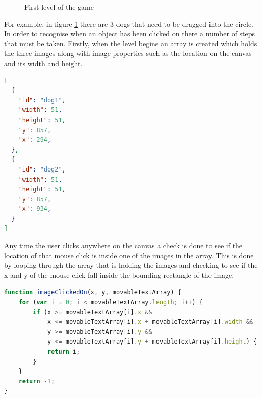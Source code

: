 \documentclass[12pt,a4paper]{report}
\begin{document}
\begin{figure}[h]
  \centering
  \begin{minipage}[b]{1\textwidth}
    \caption{First level of the game}
    \label{fig:selectDogs}
  \end{minipage}
\end{figure}
\FloatBarrier

For example, in figure \ref{fig:selectDogs} there are 3 dogs that need to be dragged into the circle. In order to recognise when an object has been clicked on there a number of steps that must be taken. Firstly, when the level begins an array is created which holds the three images along with image properties such as the location on the canvas and its width and height.

\begin{minipage}{\linewidth}
\begin{lstlisting}[language=json]
[
  {
    "id": "dog1",
    "width": 51,
    "height": 51,
    "y": 857,
    "x": 294,
  },
  {
    "id": "dog2",
    "width": 51,
    "height": 51,
    "y": 857,
    "x": 934,
  }
]
\end{lstlisting}
\end{minipage}

Any time the user clicks anywhere on the canvas a check is done to see if the location of that mouse click is inside one of the images in the array.
This is done by looping through the array that is holding the images and checking to see if the x and y of the mouse click fall inside the bounding rectangle of the image.

\begin{minipage}{\linewidth}
\begin{lstlisting}[language=JavaScript]
function imageClickedOn(x, y, movableTextArray) {
    for (var i = 0; i < movableTextArray.length; i++) {
        if (x >= movableTextArray[i].x &&
            x <= movableTextArray[i].x + movableTextArray[i].width &&
            y >= movableTextArray[i].y &&
            y <= movableTextArray[i].y + movableTextArray[i].height) {
            return i;
        }
    }
    return -1;
}
\end{lstlisting}
\end{minipage}
\end{document}
